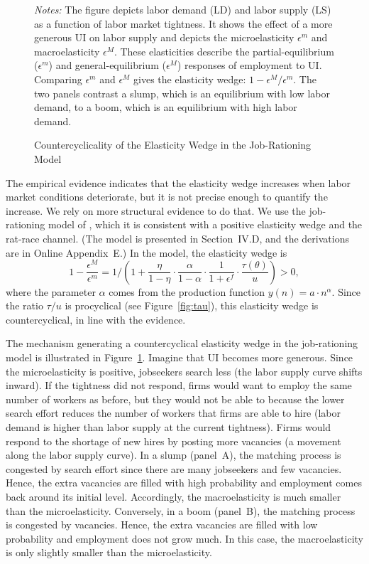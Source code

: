 \documentclass[letterpaper,12pt,leqno]{article}
\def\path{../}
\newcommand{\pre}[1]{\left( #1 \right)}
\newcommand{\fignotes}[1]{\centering\parbox[c]{\textwidth}{\footnotesize \textit{Notes:} #1}}
\def \e{{\epsilon}}
\def \t{{\theta}}
\def \a{{\alpha}}
\begin{document}
\begin{figure}[t] \centering
{}\quad
{}
\caption{Countercyclicality of the Elasticity Wedge in the Job-Rationing Model}
\fignotes{The figure depicts labor demand (LD) and labor supply (LS) as a function of labor market tightness. It shows the effect of a more generous UI on labor supply and depicts the microelasticity $\e^m$ and macroelasticity $\e^M$. These elasticities describe the partial-equilibrium ($\e^m$) and general-equilibrium ($\e^M$) responses of employment to UI. Comparing $\e^m$ and $\e^M$ gives the elasticity wedge: $1-\e^{M}/\e^{m}$. The two panels contrast a slump, which is an equilibrium with low labor demand, to a boom, which is an equilibrium with high labor demand.}
\label{fig:meca}\end{figure}

The empirical evidence indicates that the elasticity wedge increases when labor market conditions deteriorate, but it is not precise enough to quantify the increase. We rely on more structural evidence to do that. We use the job-rationing model of \citet{M09}, which it is consistent with a positive elasticity wedge and the rat-race channel. (The model is presented in Section~IV.D, and the derivations are in Online Appendix~E.) In the model, the elasticity wedge is
\begin{equation}
1-\frac{\e^{M}}{\e^{m}}=1\bigg/\pre{1+\frac{\eta}{1-\eta}\cdot\frac{\a}{1-\a}\cdot\frac{1}{1+\e^{f}}\cdot \frac{\tau(\t)}{u}}>0,
\label{eq:wedge}\end{equation} 
where the parameter $\a$ comes from the production function $y(n)=a\cdot n^{\a}$. Since the ratio $\tau/u$ is procyclical (see Figure~\ref{fig:tau}), this elasticity wedge is countercyclical, in line with the evidence. 

The mechanism generating a countercyclical elasticity wedge in the job-rationing model is illustrated in Figure~\ref{fig:meca}. Imagine that UI becomes more generous. Since the microelasticity is positive, jobseekers search less (the labor supply curve shifts inward). If the tightness did not respond, firms would want to employ the same number of workers as before, but they would not be able to because the lower search effort reduces the number of workers that firms are able to hire (labor demand is higher than labor supply at the current tightness). Firms would respond to the shortage of new hires by posting more vacancies (a movement along the labor supply curve).  In a slump (panel~A), the matching process is congested by search effort since there are many jobseekers and few vacancies. Hence, the extra vacancies are filled with high probability and employment comes back around its initial level. Accordingly, the macroelasticity is much smaller than the microelasticity. Conversely, in a boom (panel~B), the matching process is congested by vacancies. Hence, the extra vacancies are filled with low probability and employment does not grow much. In this case, the macroelasticity is only slightly smaller than the microelasticity.
\end{document}
